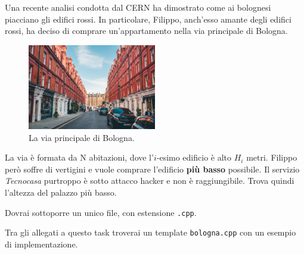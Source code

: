 \usepackage{xcolor}
\usepackage{afterpage}
\usepackage{pifont,mdframed}
\usepackage[bottom]{footmisc}
\usepackage{minted}


\newcommand{\inputfile}{\texttt{stdin}}
\newcommand{\outputfile}{\texttt{stdout}}
\makeatletter
\renewcommand{\this@inputfilename}{\texttt{stdin}}
\renewcommand{\this@outputfilename}{\texttt{stdout}}
\makeatother


Una recente analisi condotta dal CERN ha dimostrato come ai bolognesi piacciano gli edifici rossi.
In particolare, Filippo, anch'esso amante degli edifici rossi, ha deciso di comprare un'appartamento
nella via principale di Bologna.

\begin{figure}[h]
    \centering
    \includegraphics[width=0.5\textwidth]{bologna.jpg}
    \caption{La via principale di Bologna. }
\end{figure}

La via è formata da N abitazioni, dove l'$i$-esimo edificio
è alto $H_i$ metri. Filippo però soffre di vertigini e vuole comprare l'edificio \textbf{più basso} possibile.
Il servizio \textit{Tecnocasa} purtroppo è sotto attacco hacker e non è raggiungibile. Trova quindi l'altezza del palazzo più basso.


\Implementation

Dovrai sottoporre un unico file, con estensione \texttt{.cpp}.

\begin{warning}
    Tra gli allegati a questo task troverai un template \texttt{bologna.cpp} con un esempio di implementazione.
\end{warning}

